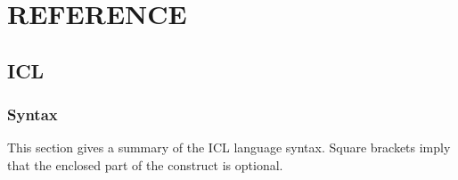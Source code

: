 \part{REFERENCE}
\label{P_refsect}

\chapter{ICL}
\label{C_rsicl}

\small

\section{Syntax}

This section gives a summary of the ICL language syntax.
Square brackets imply that the enclosed part of the construct is optional.


